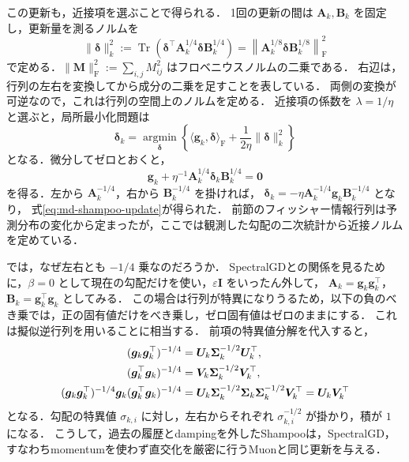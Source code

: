 \documentclass[../main.tex]{subfiles}
\begin{document}
この更新も，近接項を選ぶことで得られる．
1回の更新の間は $\bm{A}_k,\bm{B}_k$ を固定し，更新量を測るノルムを
\begin{equation}
  \|\bm{\delta}\|_k^2
  :=\operatorname{Tr}\left(
  \bm{\delta}^\top\bm{A}_k^{1/4}\bm{\delta}\bm{B}_k^{1/4}\right)
  =\left\|\bm{A}_k^{1/8}\bm{\delta}\bm{B}_k^{1/8}\right\|_{\mathrm F}^2
  \label{eq:md-shampoo-norm}
\end{equation}
で定める．$\|\bm{M}\|_{\mathrm F}^2:=\sum_{i,j}M_{ij}^2$ はフロベニウスノルムの二乗である．
右辺は，行列の左右を変換してから成分の二乗を足すことを表している．
両側の変換が可逆なので，これは行列の空間上のノルムを定める．
近接項の係数を $\lambda=1/\eta$ と選ぶと，局所最小化問題は
\begin{equation}
  \bm{\delta}_k=\underset{\bm{\delta}}{\operatorname{argmin}}
  \left\{\langle\bm{g}_k,\bm{\delta}\rangle_{\mathrm F}
  +\frac{1}{2\eta}\|\bm{\delta}\|_k^2\right\}
  \label{eq:md-shampoo-model}
\end{equation}
となる．微分してゼロとおくと，
\begin{equation}
  \bm{g}_k+\eta^{-1}\bm{A}_k^{1/4}\bm{\delta}_k\bm{B}_k^{1/4}=\bm{0}
  \label{eq:md-shampoo-stationarity}
\end{equation}
を得る．左から $\bm{A}_k^{-1/4}$，右から $\bm{B}_k^{-1/4}$ を掛ければ，
$\bm{\delta}_k=-\eta\bm{A}_k^{-1/4}\bm{g}_k\bm{B}_k^{-1/4}$ となり，
式\eqref{eq:md-shampoo-update}が得られた．
前節のフィッシャー情報行列は予測分布の変化から定まったが，ここでは観測した勾配の二次統計から近接ノルムを定めている．

では，なぜ左右とも $-1/4$ 乗なのだろうか．
SpectralGDとの関係を見るために，$\beta=0$ として現在の勾配だけを使い，$\varepsilon\bm{I}$ をいったん外して，
$\bm{A}_k=\bm{g}_k\bm{g}_k^\top$，$\bm{B}_k=\bm{g}_k^\top\bm{g}_k$ としてみる．
この場合は行列が特異になりうるため，以下の負のべき乗では，正の固有値だけをべき乗し，ゼロ固有値はゼロのままにする．
これは擬似逆行列を用いることに相当する．
前項の特異値分解を代入すると，
\begin{align}
  (\bm{g}_k\bm{g}_k^\top)^{-1/4}
  &=\bm{U}_k\bm{\Sigma}_k^{-1/2}\bm{U}_k^\top,
  \notag\\
  (\bm{g}_k^\top\bm{g}_k)^{-1/4}
  &=\bm{V}_k\bm{\Sigma}_k^{-1/2}\bm{V}_k^\top,
  \notag\\
  (\bm{g}_k\bm{g}_k^\top)^{-1/4}\bm{g}_k
  (\bm{g}_k^\top\bm{g}_k)^{-1/4}
  &=\bm{U}_k\bm{\Sigma}_k^{-1/2}
  \bm{\Sigma}_k\bm{\Sigma}_k^{-1/2}\bm{V}_k^\top
  =\bm{U}_k\bm{V}_k^\top
  \label{eq:md-shampoo-spectral-identity}
\end{align}
となる．勾配の特異値 $\sigma_{k,i}$ に対し，左右からそれぞれ $\sigma_{k,i}^{-1/2}$ が掛かり，積が $1$ になる．
こうして，過去の履歴とdampingを外したShampooは，SpectralGD，すなわちmomentumを使わず直交化を厳密に行うMuonと同じ更新を与える．
\end{document}
